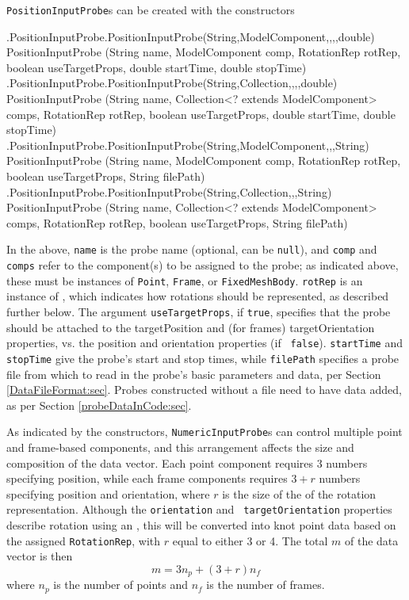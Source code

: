 {\tt PositionInputProbe}s can be created with the constructors
%
\begin{methodtable}{0.9}{0.1}
\midline
%
\methodentry
{\probes.PositionInputProbe.PositionInputProbe(String,ModelComponent,,,,double)}%
{PositionInputProbe (String name, ModelComponent comp, RotationRep rotRep,\brh
boolean useTargetProps, double startTime, double stopTime)}%
{\ }%
%
\methodspace{0.5em}%
\methodentry
{\probes.PositionInputProbe.PositionInputProbe(String,Collection,,,,double)}%
{PositionInputProbe (String name, Collection<? extends ModelComponent> comps,\brh
RotationRep rotRep, 
boolean useTargetProps, double startTime, double stopTime)}%
{\ }%
%
\methodspace{0.5em}%
\methodentry
{\probes.PositionInputProbe.PositionInputProbe(String,ModelComponent,,,String)}%
{PositionInputProbe (String name, ModelComponent comp, RotationRep rotRep,\brh
boolean useTargetProps, String filePath)}%
{\ }%
%
\methodspace{0.5em}%
\methodentry
{\probes.PositionInputProbe.PositionInputProbe(String,Collection,,,String)}%
{PositionInputProbe (String name, Collection<? extends ModelComponent> comps,\brh
RotationRep rotRep, boolean useTargetProps, String filePath)}%
{\ }%
\midline
\end{methodtable}
%
In the above, {\tt name} is the probe name (optional, can be {\tt null}), and
{\tt comp} and {\tt comps} refer to the component(s) to be assigned to the
probe; as indicated above, these must be instances of {\tt Point}, {\tt Frame},
or {\tt FixedMeshBody}. {\tt rotRep} is an instance of 
, which indicates 
how rotations should be represented, as described further below.  The argument
{\tt useTargetProps}, if {\tt true}, specifies that the probe should be
attached to the {\sf targetPosition} and (for frames) {\sf targetOrientation}
properties, vs. the {\sf position} and {\sf orientation} properties (if {\tt
false}). {\tt startTime} and {\tt stopTime} give the probe's start and stop
times, while {\tt filePath} specifies a probe file from which to read in the
probe's basic parameters and data, per Section \ref{DataFileFormat:sec}.  Probes
constructed without a file need to have data added, as per Section
\ref{probeDataInCode:sec}.

As indicated by the constructors, {\tt NumericInputProbe}s can control multiple
point and frame-based components, and this arrangement affects the size and
composition of the data vector. Each point component requires 3 numbers
specifying position, while each frame components requires $3 + r$ numbers
specifying position and orientation, where $r$ is the size of the of the
rotation representation. Although the {\tt orientation} and {\tt
targetOrientation} properties describe rotation using an
, this will be converted
into knot point data based on the assigned {\tt RotationRep}, with $r$ equal to
either 3 or 4. The total $m$ of the data vector is then
%
\begin{equation*}
m = 3 n_p + (3 + r) n_f
\end{equation*}
%
where $n_p$ is the number of points and $n_f$ is the number of frames.

